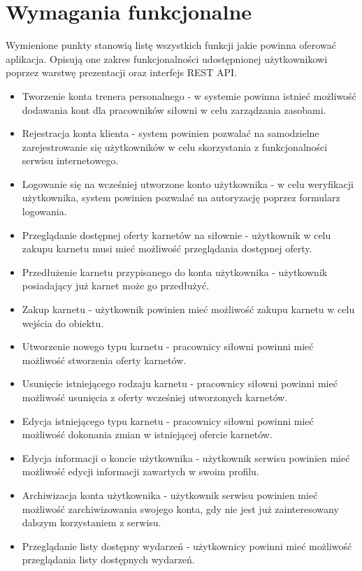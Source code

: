 \documentclass[a4paper,twoside,12pt]{book}
\begin{document}
{	\section{Wymagania funkcjonalne} 
	\label{sec:req}
	Wymienione punkty stanowią listę wszystkich funkcji jakie powinna oferować aplikacja. Opisują one zakres funkcjonalności udostępnionej użytkownikowi poprzez warstwę prezentacji oraz interfejs REST API.
		\begin{itemize}
			\item Tworzenie konta trenera personalnego - w systemie powinna istnieć możliwość dodawania kont dla pracowników siłowni w celu zarządzania zasobami.
			\item Rejestracja konta klienta - system powinien pozwalać na samodzielne zarejestrowanie się użytkowników w celu skorzystania z funkcjonalności serwisu internetowego.
			\item Logowanie się na wcześniej utworzone konto użytkownika - w celu weryfikacji użytkownika, system powinien pozwalać na autoryzację poprzez formularz logowania.
			\item Przeglądanie dostępnej oferty karnetów na siłownie - użytkownik w celu zakupu karnetu musi mieć możliwość przeglądania dostępnej oferty.
			\item Przedłużenie karnetu przypisanego do konta użytkownika - użytkownik posiadający już karnet może go przedłużyć.
			\item Zakup karnetu - użytkownik powinien mieć możliwość zakupu karnetu w celu wejścia do obiektu.
			\item Utworzenie nowego typu karnetu - pracownicy siłowni powinni mieć możliwość stworzenia oferty karnetów.
			\item Usunięcie istniejącego rodzaju karnetu - pracownicy siłowni powinni mieć możliwość usunięcia z oferty wcześniej utworzonych karnetów.
			\item Edycja istniejącego typu karnetu - pracownicy siłowni powinni mieć możliwość dokonania zmian w istniejącej ofercie karnetów.
			\item Edycja informacji o koncie użytkownika - użytkownik serwisu powinien mieć możliwość edycji informacji zawartych w swoim profilu.
			\item Archiwizacja konta użytkownika - użytkownik serwisu powinien mieć możliwość zarchiwizowania swojego konta, gdy nie jest już zainteresowany dalszym korzystaniem z serwisu.
			\item Przeglądanie listy dostępny wydarzeń - użytkownicy powinni mieć możliwość przeglądania listy dostępnych wydarzeń.

\end{itemize}}
\end{document}
